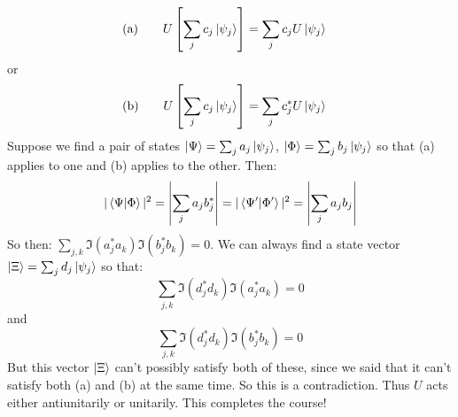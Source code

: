 \documentclass{article}
\begin{document}
\begin{align*}\textrm{(a)} &\qquad U\left[\sum_j c_j \ket{\psi_j}\right] = \sum_j c_j U\ket{\psi_j}\end{align*}
or
\begin{align*}\textrm{(b)} & \qquad U\left[\sum_j c_j \ket{\psi_j}\right] = \sum_j c_j^* U\ket{\psi_j}\end{align*}
Suppose we find a pair of states $\ket{\Psi} = \sum_j a_j\ket{\psi_j}$, $\ket{\Phi}=\sum_j b_j\ket{\psi_j}$ so that (a) applies to one and (b) applies to the other. Then:
\[|\braket{\Psi}{\Phi}|^2 = \left|\sum_j a_j b_j^*\right| =|\braket{\Psi'}{\Phi'}|^2  =  \left|\sum_j a_j b_j\right|\]
So then: $\sum_{j,k} \Im(a_j^* a_k)\Im(b_j^* b_k) = 0$. We can always find a state vector $\ket{\Xi} = \sum_j d_j \ket{\psi_j}$ so that:
\[\sum_{j,k} \Im(d_j^* d_k)\Im(a_j^* a_k) = 0\] 
and
\[\sum_{j,k} \Im(d_j^* d_k)\Im(b_j^* b_k) = 0\]
But this vector $\ket\Xi$ can't possibly satisfy both of these, since we said that it can't satisfy both (a) and (b) at the same time. So this is a contradiction. Thus $U$ acts either antiunitarily or unitarily. This completes the course!


\pagebreak



\nocite{*}
\printbibliography
\end{document}
